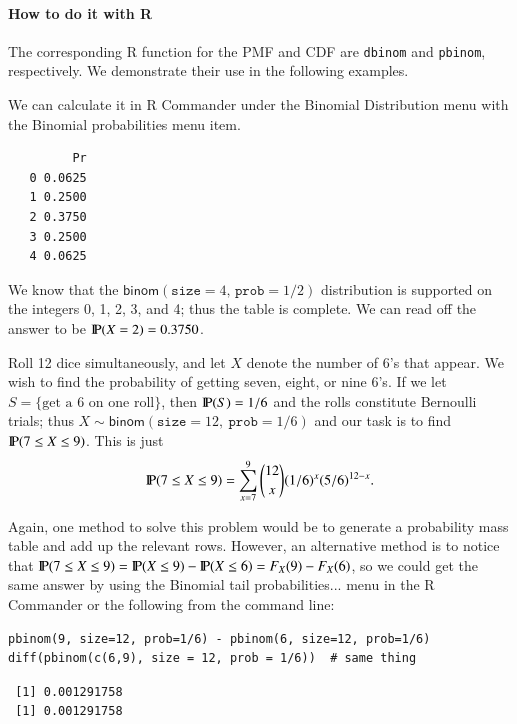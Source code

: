 \documentclass[captions=tableheading]{scrbook}
\begin{document}
\paragraph*{How to do it with \textsf{R}}

The corresponding \textsf{R} function for the PMF and CDF are \texttt{dbinom} and \texttt{pbinom}, respectively. We demonstrate their use in the following examples.  

\begin{example}
We can calculate it in \textsf{R} Commander under the \textsf{Binomial Distribution} menu with the \textsf{Binomial probabilities} menu item.


\begin{verbatim}
         Pr
   0 0.0625
   1 0.2500
   2 0.3750
   3 0.2500
   4 0.0625
\end{verbatim}

\end{example}

We know that the \(\mathsf{binom}(\mathtt{size}=4,\,\mathtt{prob}=1/2)\) distribution is supported on the integers 0, 1, 2, 3, and 4; thus the table is complete. We can read off the answer to be \(\P(X=2)=0.3750\).

\begin{example}
Roll 12 dice simultaneously, and let \(X\) denote the number of 6's that appear. We wish to find the probability of getting seven, eight, or nine 6's. If we let \(S=\{ \mbox{get a 6 on one roll} \} \), then \(\P(S)=1/6\) and the rolls constitute Bernoulli trials; thus \(X\sim\mathsf{binom}(\mathtt{size}=12,\ \mathtt{prob}=1/6)\) and our task is to find \(\P(7\leq X\leq9)\). This is just
\[ 
\P(7\leq X\leq9)=\sum_{x=7}^{9}{12 \choose x}(1/6)^{x}(5/6)^{12-x}.
\]

Again, one method to solve this problem would be to generate a probability mass table and add up the relevant rows. However, an alternative method is to notice that \(\P(7\leq X\leq9)=\P(X\leq9)-\P(X\leq6)=F_{X}(9)-F_{X}(6)\), so we could get the same answer by using the \textsf{Binomial tail probabilities}... menu in the \textsf{R} Commander or the following from the command line: 


\begin{verbatim}
pbinom(9, size=12, prob=1/6) - pbinom(6, size=12, prob=1/6)
diff(pbinom(c(6,9), size = 12, prob = 1/6))  # same thing
\end{verbatim}

\begin{verbatim}
 [1] 0.001291758
 [1] 0.001291758
\end{verbatim}

\end{example}
\end{document}

